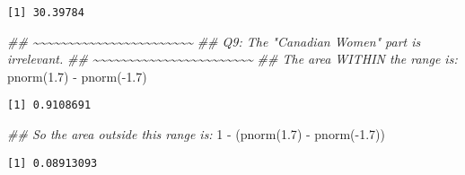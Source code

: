 \documentclass[
  letterpaper,
  DIV=11,
  numbers=noendperiod]{scrreprt}
\newenvironment{Shaded}{\begin{snugshade}}{\end{snugshade}}
\newcommand{\DecValTok}[1]{\textcolor[rgb]{0.68,0.00,0.00}{#1}}
\newcommand{\DocumentationTok}[1]{\textcolor[rgb]{0.37,0.37,0.37}{\textit{#1}}}
\newcommand{\FloatTok}[1]{\textcolor[rgb]{0.68,0.00,0.00}{#1}}
\newcommand{\FunctionTok}[1]{\textcolor[rgb]{0.28,0.35,0.67}{#1}}
\newcommand{\NormalTok}[1]{\textcolor[rgb]{0.00,0.23,0.31}{#1}}
\newcommand{\SpecialCharTok}[1]{\textcolor[rgb]{0.37,0.37,0.37}{#1}}
\begin{document}
\begin{verbatim}
[1] 30.39784
\end{verbatim}

\begin{Shaded}
\begin{Highlighting}[]
\DocumentationTok{\#\# \textasciitilde{}\textasciitilde{}\textasciitilde{}\textasciitilde{}\textasciitilde{}\textasciitilde{}\textasciitilde{}\textasciitilde{}\textasciitilde{}\textasciitilde{}\textasciitilde{}\textasciitilde{}\textasciitilde{}\textasciitilde{}\textasciitilde{}\textasciitilde{}\textasciitilde{}\textasciitilde{}\textasciitilde{}\textasciitilde{}\textasciitilde{}\textasciitilde{}\textasciitilde{}}
\DocumentationTok{\#\# Q9: The "Canadian Women" part is irrelevant.}
\DocumentationTok{\#\# \textasciitilde{}\textasciitilde{}\textasciitilde{}\textasciitilde{}\textasciitilde{}\textasciitilde{}\textasciitilde{}\textasciitilde{}\textasciitilde{}\textasciitilde{}\textasciitilde{}\textasciitilde{}\textasciitilde{}\textasciitilde{}\textasciitilde{}\textasciitilde{}\textasciitilde{}\textasciitilde{}\textasciitilde{}\textasciitilde{}\textasciitilde{}\textasciitilde{}\textasciitilde{}}
\DocumentationTok{\#\# The area WITHIN the range is:}
\FunctionTok{pnorm}\NormalTok{(}\FloatTok{1.7}\NormalTok{) }\SpecialCharTok{{-}} \FunctionTok{pnorm}\NormalTok{(}\SpecialCharTok{{-}}\FloatTok{1.7}\NormalTok{)}
\end{Highlighting}
\end{Shaded}

\begin{verbatim}
[1] 0.9108691
\end{verbatim}

\begin{Shaded}
\begin{Highlighting}[]
\DocumentationTok{\#\# So the area outside this range is:}
\DecValTok{1} \SpecialCharTok{{-}}\NormalTok{ (}\FunctionTok{pnorm}\NormalTok{(}\FloatTok{1.7}\NormalTok{) }\SpecialCharTok{{-}} \FunctionTok{pnorm}\NormalTok{(}\SpecialCharTok{{-}}\FloatTok{1.7}\NormalTok{))}
\end{Highlighting}
\end{Shaded}

\begin{verbatim}
[1] 0.08913093
\end{verbatim}
\end{document}
